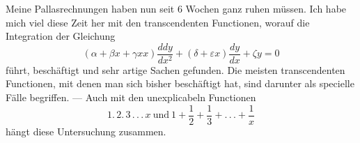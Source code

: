 \noindent{}\par
\noindent\hspace*{\parindent}Meine Pallasrechnungen haben nun seit 6 Wochen ganz ruhen müssen. Ich habe mich viel diese Zeit her mit den transcendenten Functionen, worauf die Integration der Gleichung
\[
(\alpha+\beta x+\gamma xx)\frac{ddy}{dx^2}+(\delta+\varepsilon x)\frac{dy}{dx}+\zeta y=0
\]
\noindent führt, beschäftigt und sehr artige Sachen gefunden. Die meisten transcendenten Functionen, mit denen man sich bisher beschäftigt hat, sind darunter als specielle Fälle begriffen. — Auch mit den unexplicabeln Functionen
\[
1{.}\,2{.}\,3\,{.}\,{.}\,{.}\,x\ \text{und}\ 1+\frac{1}{2}+\frac{1}{3}+{.}\,{.}\,{.}+\frac{1}{x}
\]
\noindent hängt diese Untersuchung zusammen.
\par
